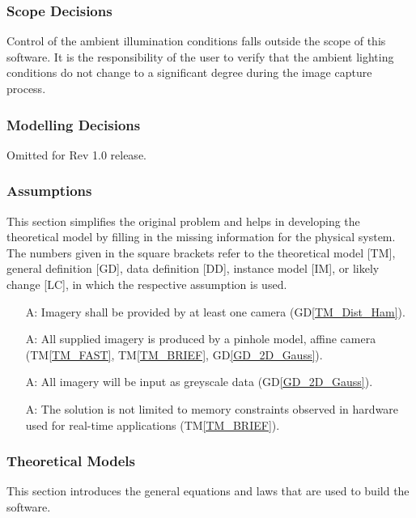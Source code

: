 \documentclass[12pt]{article}
\newcommand{\dref}[1]{GD\ref{#1}}
\newcommand{\tref}[1]{TM\ref{#1}}
\newcounter{assumpnum} %
\begin{document}
\subsubsection{Scope Decisions}
Control of the ambient illumination conditions falls outside the scope of this software.
It is the responsibility of the user to verify that the ambient lighting conditions do 
not change to a significant degree during the image capture process.


\subsubsection{Modelling Decisions}
Omitted for Rev 1.0 release.

\subsubsection{Assumptions} \label{sec_assumpt}
This section simplifies the original problem and helps in developing the
theoretical model by filling in the missing information for the physical system.
The numbers given in the square brackets refer to the theoretical model [TM],
general definition [GD], data definition [DD], instance model [IM], or likely
change [LC], in which the respective assumption is used.

\begin{itemize}
\item[A\refstepcounter{assumpnum}\theassumpnum \label{A_min_num_cameras}:]
Imagery shall be provided by at least one camera (\dref{TM_Dist_Ham}).

\item[A\refstepcounter{assumpnum}\theassumpnum \label{A_camera_model}:]
All supplied imagery is produced by a pinhole model, affine camera 
(\tref{TM_FAST}, \tref{TM_BRIEF}, \dref{GD_2D_Gauss}).

\item[A\refstepcounter{assumpnum}\theassumpnum \label{A_greyscale}:]
All imagery will be input as greyscale data (\dref{GD_2D_Gauss}).

\item[A\refstepcounter{assumpnum}\theassumpnum \label{A_RT_Memory}:]
The solution is not limited to memory constraints observed in hardware used for real-time 
applications (\tref{TM_BRIEF}).

\end{itemize}

\subsubsection{Theoretical Models}\label{sec_theoretical}
This section introduces the general equations and laws that are used to build the 
\progname{} software.
\end{document}
